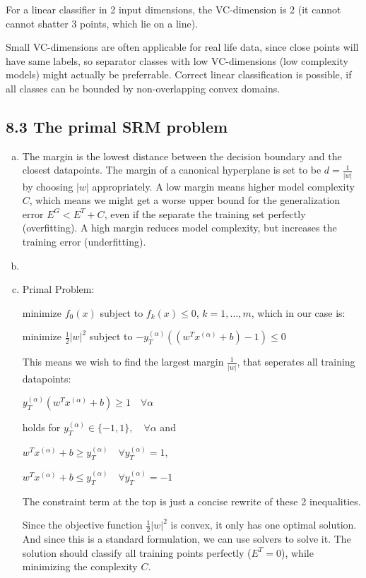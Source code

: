\documentclass[10pt,a4paper]{article}
\begin{document}
\begin{enumerate}[a)]
For a linear classifier in 2 input dimensions, the VC-dimension is 2 (it cannot cannot shatter 3 points, which lie on a line). 

Small VC-dimensions are often applicable for real life data, since close points will have same labels, so separator classes with low VC-dimensions (low complexity models) might actually be preferrable.
Correct linear classification is possible, if all classes can be bounded by non-overlapping convex domains.

\end{enumerate}
\clearpage
\subsection*{8.3 The primal SRM problem}
\begin{enumerate}[a)]
\item
The margin is the lowest distance between the decision boundary and the closest datapoints. The margin of a canonical hyperplane is set to be $d = \frac{1}{|w|}$ by choosing $|w|$ appropriately.
A low margin means higher model complexity $C$, which means we might get a worse upper bound for the generalization error $E^G < E^T + C$, even if the separate the training set perfectly (overfitting).
A high margin reduces model complexity, but increases the training error (underfitting).
\item

\item
Primal Problem:

minimize $f_{0}(x)$ subject to $f_{k}(x) \leq 0$, $k=1,...,m$, which in our case is:

minimize $\frac{1}{2}|w|^2$ subject to $-y_T^{(\alpha)}((w^Tx^{(\alpha)}+b)-1) \leq 0$

This means we wish to find the largest margin $\frac{1}{|w|}$, that seperates all training datapoints:

$y_T^{(\alpha)}(w^Tx^{(\alpha)} + b) \geq 1 \quad \forall \alpha$

holds for
$y_T^{(\alpha)} \in \{-1, 1\}, \quad \forall \alpha$ and

$ w^Tx^{(\alpha)} + b \geq y_T^{(\alpha)} \quad \forall y_T^{(\alpha)} = 1$,

$ w^Tx^{(\alpha)} + b \leq y_T^{(\alpha)} \quad \forall y_T^{(\alpha)} = -1$

The constraint term at the top is just a concise rewrite of these 2 inequalities.

Since the objective function $\frac{1}{2}|w|^2$ is convex, it only has one optimal solution. And since this is a standard formulation, we can use solvers to solve it.
The solution should classify all training points perfectly ($E^T = 0$), while minimizing the complexity $C$.

\end{enumerate}
\end{document}
